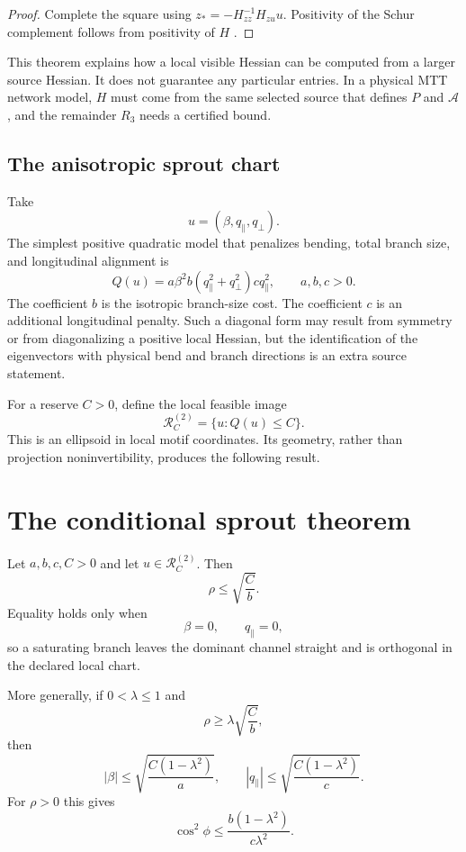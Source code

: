 \documentclass[11pt]{article}
\newcommand{\Adm}{\mathcal A}
\newcommand{\Image}{\mathcal R}
\begin{document}
\begin{proof}
Complete the square using
$z_\ast=-H_{zz}^{-1}H_{zu}u$.  Positivity of the Schur complement follows
from positivity of $H$ \cite{hornjohnson2013}.
\end{proof}

This theorem explains how a local visible Hessian can be computed from a
larger source Hessian.  It does not guarantee any particular entries.  In a
physical MTT network model, $H$ must come from the same selected source that
defines $P$ and $\Adm$, and the remainder $R_3$ needs a certified bound.

\subsection{The anisotropic sprout chart}

Take
\[
  u=(\beta,q_\parallel,q_\perp).
\]
The simplest positive quadratic model that penalizes bending, total branch
size, and longitudinal alignment is
\[
  Q(u)
  =
  a\beta^2
  b(q_\parallel^2+q_\perp^2)
  cq_\parallel^2,
  \qquad a,b,c>0.
\]
The coefficient $b$ is the isotropic branch-size cost.  The coefficient $c$
is an additional longitudinal penalty.  Such a diagonal form may result
from symmetry or from diagonalizing a positive local Hessian, but the
identification of the eigenvectors with physical bend and branch directions
is an extra source statement.

For a reserve $C>0$, define the local feasible image
\[
  \Image_C^{(2)}=\{u:Q(u)\leq C\}.
\]
This is an ellipsoid in local motif coordinates.  Its geometry, rather than
projection noninvertibility, produces the following result.

\section{The conditional sprout theorem}

\begin{theorem}
Let $a,b,c,C>0$ and let $u\in\Image_C^{(2)}$.  Then
\[
  \rho\leq\sqrt{\frac{C}{b}}.
\]
Equality holds only when
\[
  \beta=0,\qquad q_\parallel=0,
\]
so a saturating branch leaves the dominant channel straight and is
orthogonal in the declared local chart.

More generally, if $0<\lambda\leq1$ and
\[
  \rho\geq\lambda\sqrt{\frac{C}{b}},
\]
then
\[
  |\beta|
  \leq
  \sqrt{\frac{C(1-\lambda^2)}{a}},
\qquad
  |q_\parallel|
  \leq
  \sqrt{\frac{C(1-\lambda^2)}{c}}.
\]
For $\rho>0$ this gives
\[
  \cos^2\phi
  \leq
  \frac{b(1-\lambda^2)}{c\lambda^2}.
\]
\end{theorem}
\end{document}
